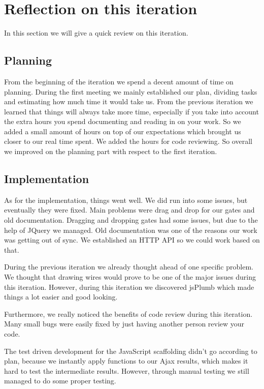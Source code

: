 \documentclass[a4paper]{article}
\begin{document}
\section{Reflection on this iteration}
In this section we will give a quick review on this iteration. \\

\subsection{Planning}
From the beginning of the iteration we spend a decent amount of time on planning. During the first meeting we mainly established our plan, dividing tasks and estimating how much time it would take us. From the previous iteration we learned that things will always take more time, especially if you take into account the extra hours you spend documenting and reading in on your work. So we added a small amount of hours on top of our expectations which brought us closer to our real time spent. We added the hours for code reviewing. So overall we improved on the planning part with respect to the first iteration. 

\subsection{Implementation}
As for the implementation, things went well. We did run into some issues, but eventually they were fixed. Main problems were drag and drop for our gates and old documentation. 
Dragging and dropping gates had some issues, but due to the help of JQuery we managed.
Old documentation was one of the reasons our work was getting out of sync. We established an HTTP API so we could work based on that. 

During the previous iteration we already thought ahead of one specific problem. We thought that drawing wires would prove to be one of the major issues during this iteration. However, during this iteration we discovered jsPlumb which made things a lot easier and good looking.

Furthermore, we really noticed the benefits of code review during this iteration. Many small bugs were easily fixed by just having another person review your code.

The test driven development for the JavaScript scaffolding didn't go according to plan, because we instantly apply functions to our Ajax results, which makes it hard to test the intermediate results. However, through manual testing we still managed to do some proper testing.
\end{document}

